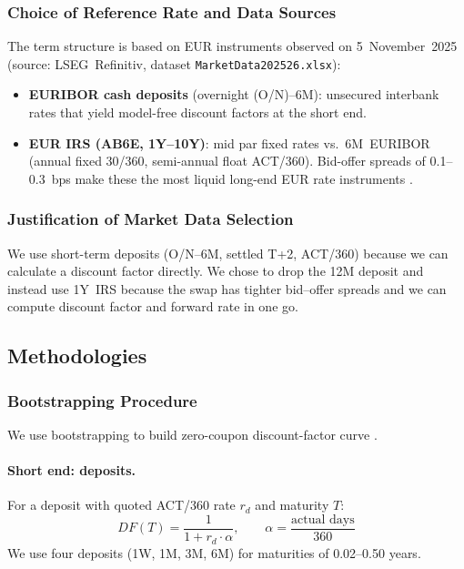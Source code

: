 \documentclass[11pt,a4paper]{article}
\begin{document}
\subsubsection{Choice of Reference Rate and Data Sources}

The term structure is based on EUR instruments observed on
5~November~2025 (source: LSEG~Refinitiv, dataset \texttt{MarketData202526.xlsx}):

\begin{itemize}[leftmargin=*]\setlength{\itemsep}{1pt}
  \item \textbf{EURIBOR cash deposits} (overnight (O/N)--6M): unsecured interbank rates that yield model-free discount factors at the short end.
  \item \textbf{EUR IRS (AB6E, 1Y--10Y)}: mid par fixed rates vs.\ 6M~EURIBOR (annual fixed 30/360, semi-annual float ACT/360). Bid-offer spreads of 0.1--0.3~bps make these the most liquid long-end EUR rate instruments \parencite[Ch.~2]{Tuckman2011}.
\end{itemize}

\subsubsection{Justification of Market Data Selection}

We use short-term deposits (O/N--6M, settled T+2, ACT/360) because we can calculate a discount factor directly\parencite[p.~92]{Choudhry2010}. We chose to drop the 12M deposit and instead use 1Y~IRS because the swap has tighter bid--offer spreads and we can compute discount factor and  forward rate in one go.

\subsection{Methodologies}

\subsubsection{Bootstrapping Procedure}
\label{sssec:bootstrapping}

We use bootstrapping to build zero-coupon discount-factor curve 
\parencite[Ch.~3]{Choudhry2010}.

\paragraph{Short end: deposits.}
For a deposit with quoted ACT/360 rate $r_d$ and maturity $T$:
\begin{equation}
  DF(T) = \frac{1}{1 + r_d \cdot \alpha},
  \qquad \alpha = \frac{\text{actual days}}{360}
  \label{eq:deposit_df}
\end{equation}
We use four deposits (1W, 1M, 3M, 6M) for maturities of 0.02--0.50 years.
\end{document}
